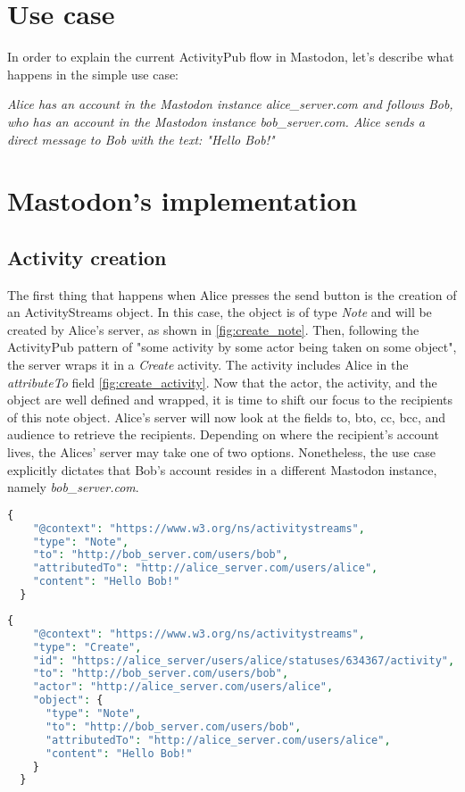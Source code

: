 \section{Use case}\label{section:use case}
In order to explain the current ActivityPub flow in Mastodon, let's describe what happens in the simple use case:

\emph{Alice has an account in the Mastodon instance alice\_server.com and follows Bob, who has an account in the Mastodon instance bob\_server.com. Alice sends a direct message to Bob with the text: "Hello Bob!" }

\section{Mastodon's implementation}

\subsection{Activity creation}
The first thing that happens when Alice presses the send button is the creation of an ActivityStreams object. In this case, the object is of type \emph{Note} and will be created by Alice's server, as shown in \ref{fig:create_note}. Then, following the ActivityPub pattern of "some activity by some actor being taken on some object"\cite{lemmer-webber_tallon_guy_prodromou_2018}, the server wraps it in a \emph{Create} activity. The activity includes Alice in the \emph{attributeTo} field \ref{fig:create_activity}. Now that the actor, the activity, and the object are well defined and wrapped, it is time to shift our focus to the recipients of this note object. 
Alice's server will now look at the fields to, bto, cc, bcc, and audience to retrieve the recipients. Depending on where the recipient's account lives, the Alices' server may take one of two options. Nonetheless, the use case explicitly dictates that Bob's account resides in a different Mastodon instance, namely \emph{bob\_server.com}.

\lstset{style=JSONStyle}
\begin{lstlisting}[language=PHP, caption=ActivityStreams note object, label=fig:create_note]
  {
    "@context": "https://www.w3.org/ns/activitystreams",
    "type": "Note",
    "to": "http://bob_server.com/users/bob",
    "attributedTo": "http://alice_server.com/users/alice",
    "content": "Hello Bob!"
  }
\end{lstlisting}

\lstset{style=JSONStyle}
\begin{lstlisting}[language=PHP, caption=ActivityStreams create activity, label=fig:create_activity]
  {
    "@context": "https://www.w3.org/ns/activitystreams",
    "type": "Create",
    "id": "https://alice_server/users/alice/statuses/634367/activity",
    "to": "http://bob_server.com/users/bob",
    "actor": "http://alice_server.com/users/alice",
    "object": {
      "type": "Note",
      "to": "http://bob_server.com/users/bob",
      "attributedTo": "http://alice_server.com/users/alice",
      "content": "Hello Bob!"
    }
  }
\end{lstlisting}

